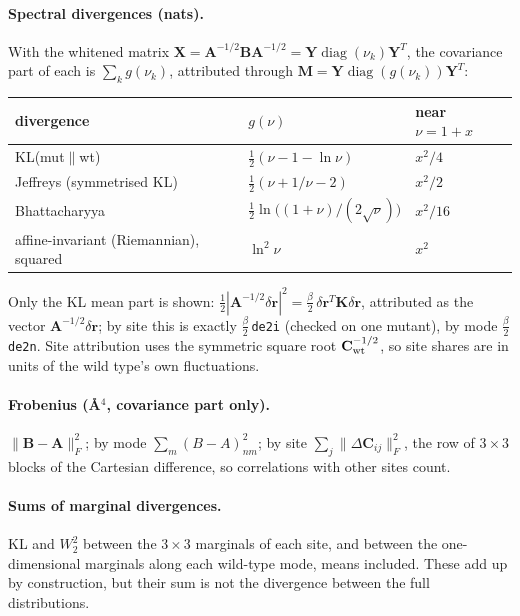 \documentclass[11pt]{article}
\newcommand{\code}[1]{\texttt{#1}}
\begin{document}
\paragraph{Spectral divergences (nats).} With the whitened matrix
$\mathbf{X}=\mathbf{A}^{-1/2}\mathbf{B}\mathbf{A}^{-1/2}=\mathbf{Y}\operatorname{diag}(\nu_k)\mathbf{Y}^T$, the
covariance part of each is $\sum_k g(\nu_k)$, attributed through $\mathbf{M}=\mathbf{Y}\operatorname{diag}(g(\nu_k))\mathbf{Y}^T$:
\begin{center}
\begin{tabular}{lll}
\toprule
divergence & $g(\nu)$ & near $\nu=1+x$ \\
\midrule
KL(mut$\|$wt) & $\tfrac12(\nu-1-\ln\nu)$ & $x^2/4$ \\
Jeffreys (symmetrised KL) & $\tfrac12(\nu+1/\nu-2)$ & $x^2/2$ \\
Bhattacharyya & $\tfrac12\ln\bigl((1+\nu)/(2\sqrt\nu)\bigr)$ & $x^2/16$ \\
affine-invariant (Riemannian), squared & $\ln^2\nu$ & $x^2$ \\
\bottomrule
\end{tabular}
\end{center}
Only the KL mean part is shown: $\tfrac12|\mathbf{A}^{-1/2}\delta\mathbf{r}|^2=\tfrac\beta2\,\delta\mathbf{r}^T\mathbf{K}\delta\mathbf{r}$,
attributed as the vector $\mathbf{A}^{-1/2}\delta\mathbf{r}$; by site this is exactly $\tfrac\beta2\,$\code{de2i}
(checked on one mutant), by mode $\tfrac\beta2\,$\code{de2n}.
Site attribution uses the symmetric square root $\mathbf{C}_{\rm wt}^{-1/2}$, so site shares are in units of the
wild type's own fluctuations.

\paragraph{Frobenius (\AA$^4$, covariance part only).} $\|\mathbf{B}-\mathbf{A}\|_F^2$; by mode
$\sum_m(B-A)_{nm}^2$; by site $\sum_j\|\Delta\mathbf{C}_{ij}\|_F^2$, the row of $3\times3$ blocks of the Cartesian
difference, so correlations with other sites count.

\paragraph{Sums of marginal divergences.} KL and $W_2^2$ between the $3\times3$ marginals of each site,
and between the one-dimensional marginals along each wild-type mode, means included. These add up by
construction, but their sum is not the divergence between the full distributions.
\end{document}
